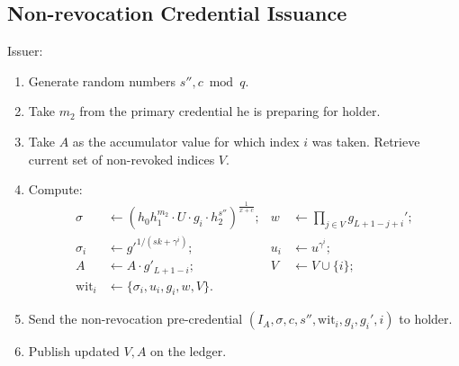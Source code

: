 \documentclass[a4paper]{article}
\begin{document}
\subsection{Non-revocation Credential Issuance}

Issuer:
\begin{enumerate}
    \item Generate random numbers $s'',c\bmod{q}$.
    \item Take $m_2$ from the primary
    credential he is preparing for holder.
    \item Take $A$ as the accumulator value for which index $i$ was taken. Retrieve current set of non-revoked indices $V$.
    \item Compute:
\begin{align}
\sigma &\leftarrow \left( h_0 h_1^{m_2}\cdot U\cdot  g_i\cdot  h_2^{s''}\right)^{\frac{1}{x+c}};&
w &\leftarrow \prod_{j\in V}g_{L+1-j+i}';\\
\sigma_i &\leftarrow g'^{1/(sk+\gamma^i)};&
u_i &\leftarrow u^{\gamma^i};\\
A&\leftarrow A\cdot g'_{L+1-i};&
V&\leftarrow V\cup\{i\};\\
\mathrm{wit}_i&\leftarrow\{\sigma_i,u_i,g_i,w,V\}.
\end{align}
\item Send the non-revocation pre-credential  $(I_A,\sigma,c,s'',\mathrm{wit}_i,g_i,g_i',i)$ to holder.
\item  Publish updated $V, A$ on the ledger.
\end{enumerate}
\end{document}
